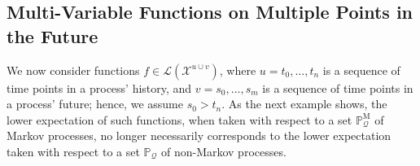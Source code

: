 \documentclass[10pt]{paper}
\theoremstyle{definition}
\newtheorem{theorem}{Theorem}
\newcommand{\reals}{\mathbb{R}}
\newcommand{\realspos}{\reals_{>0}}
\newcommand{\realsnonneg}{\reals_{\geq 0}}
\newcommand{\states}{\mathcal{X}}
\newcommand{\processes}{\mathbb{P}}
\newcommand{\mprocesses}{\processes^{\mathrm{M}}}
\newcommand{\gambles}{\mathcal{L}}
\newcommand{\rateset}{\mathcal{Q}}
\newcommand{\lrate}{\underline{Q}}
\newcommand{\norm}[1]{\left\lVert #1 \right\rVert}
\begin{document}

\subsection{Multi-Variable Functions on Multiple Points in the Future}\label{sec:decomposition}


We now consider functions $f\in\gambles(\states^{u\cup v})$, where $u=t_0,\ldots,t_n$ is a sequence of time points in a process' history, and $v=s_0,\ldots,s_m$ is a sequence of time points in a process' future; hence, we assume $s_0>t_n$. As the next example shows, the lower expectation of such functions, when taken with respect to a set $\mprocesses_\rateset$ of Markov processes, no longer necessarily corresponds to the lower expectation taken with respect to a set $\processes_\rateset$ of non-Markov processes.
\end{document}
